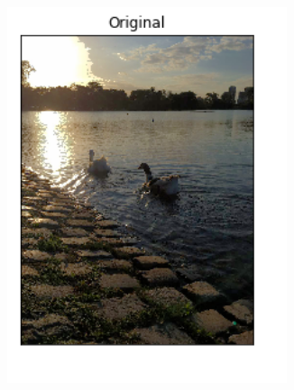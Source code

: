 \documentclass[10pt, a4paper]{article}
\begin{document}
\begin{figure}[H]	
	\centering
    \begin{subfigure}{0.3\textwidth}
        \includegraphics[width=0.9\textwidth]{patitos-k2.png}
    \end{subfigure}\hfill
    	\centering
    \begin{subfigure}{0.3\textwidth}

\end{subfigure}
\end{figure}
\end{document}
